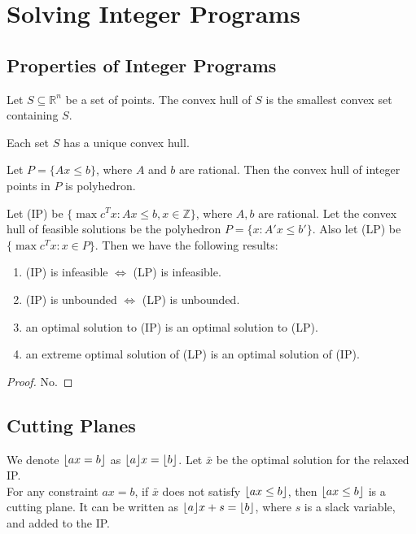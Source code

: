 \documentclass[a4paper]{report}
\DeclarePairedDelimiter\floor{\lfloor}{\rfloor}
\begin{document}
\newpage

\section{Solving Integer Programs}
\subsection{Properties of Integer Programs}
\begin{definition}
  Let $S \subseteq \mathbb R^n$ be a set of points. The convex hull of $S$ is the smallest convex set containing $S$.
  \begin{corollary}
    Each set $S$ has a unique convex hull.
  \end{corollary}
\end{definition}

\begin{theorem}
  Let $P = \{Ax \leq b\}$, where $A$ and $b$ are rational. Then the convex hull of integer points in $P$ is polyhedron.
\end{theorem}

\begin{theorem}
  Let (IP) be $\{\max c^Tx : Ax \leq b, x \in \mathbb Z\}$, where $A, b$ are rational. Let the convex hull of feasible solutions be the polyhedron $P =\{x : A' x \leq b'\}$. Also let (LP) be $\{\max c^T x : x \in P\}$. Then we have the following results:
  \begin{enumerate}
    \item (IP) is infeasible $\iff$ (LP) is infeasible.
    \item (IP) is unbounded $\iff$ (LP) is unbounded.
    \item an optimal solution to (IP) is an optimal solution to (LP).
    \item an extreme optimal solution of (LP) is an optimal solution of (IP).
  \end{enumerate}
  \begin{proof}
    No.
  \end{proof}
\end{theorem}

\subsection{Cutting Planes}

\begin{definition}
  We denote $\floor{ax = b}$ as $\floor{a}x = \floor{b}$. Let $\bar x$ be the optimal solution for the relaxed IP. \\
  For any constraint $ax = b$, if $\bar x$ does not satisfy $\floor{ax \leq b}$, then $\floor{ax \leq b}$ is a cutting plane. It can be written as $\floor{a}x + s = \floor{b}$, where $s$ is a slack variable, and added to the IP.
\end{definition}
\end{document}
